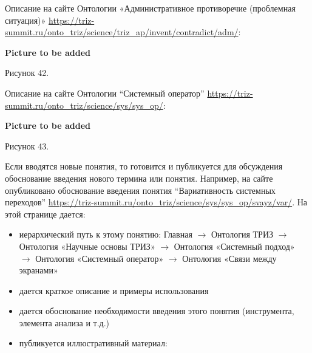 \documentclass[11pt,a4paper]{article}
\newcommand{\addpicture}{\textbf{Picture to be added}\par}
\begin{document}
Описание на сайте Онтологии «Административное противоречие (проблемная
ситуация)»
\url{https://triz-summit.ru/onto_triz/science/triz_ap/invent/contradict/adm/}:
\begin{center}
  \addpicture
  Рисунок 42.
\end{center}
Описание на сайте Онтологии “Системный оператор”
\url{https://triz-summit.ru/onto_triz/science/sys/sys_op/}:
\begin{center}
  \addpicture
  Рисунок 43.
\end{center}
Если вводятся новые понятия, то готовится и публикуется для обсуждения
обоснование введения нового термина или понятия. Например, на сайте
опубликовано обоснование введения понятия “Вариативность системных переходов”
\url{https://triz-summit.ru/onto_triz/science/sys/sys_op/svayz/var/}. На этой
странице дается:
\begin{itemize}
\item иерархический путь к этому понятию: Главная $\to$ Онтология ТРИЗ $\to$
  Онтология «Научные основы ТРИЗ» $\to$ Онтология «Системный подход» $\to$
  Онтология «Системный оператор» $\to$ Онтология «Связи между экранами»
\item дается краткое описание и примеры использования
\item дается обоснование необходимости введения этого понятия (инструмента,
  элемента анализа и т.д.)
\item публикуется иллюстративный материал:
\end{itemize}
\end{document}
